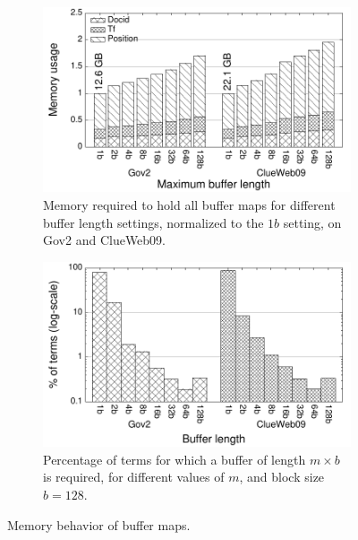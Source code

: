 \begin{figure}[t]
  \centering
  \begin{subfigure}[b]{0.45\textwidth}
    \includegraphics[width=\textwidth]{Figures/memory_usage.pdf}
    \caption{Memory required to hold all buffer maps for different buffer length settings, normalized to the $1b$ setting, on Gov2 and ClueWeb09.
    \label{figure:memoryUsage}}
  \end{subfigure}
  \begin{subfigure}[b]{0.45\textwidth}
    \includegraphics[width=\textwidth]{Figures/buffer_length_32b.pdf}
    \caption{Percentage of terms for which a buffer of length $m \times b$ is required, for different values of $m$, and block size $b=128$.
    \label{figure:bufferLengthDist}}
  \end{subfigure}
  \caption{Memory behavior of buffer maps.}
\end{figure}

